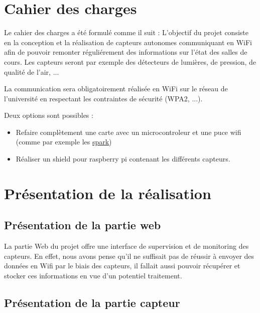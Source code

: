 \section{Cahier des charges}
	\par
	Le cahier des charges a été formulé comme il suit : L'objectif du
	projet consiste en la conception et la réalisation de capteurs autonomes
	communiquant en WiFi afin de pouvoir remonter réguliérement des informations
	sur l'état des salles de cours. Les capteurs seront par exemple des détecteurs de
	lumières, de pression, de qualité de l'air, ...
	\par
	La communication sera obligatoirement réalisée en WiFi sur le réseau
	de l'université en respectant les contraintes de sécurité (WPA2, ...).
	\par
	Deux options sont possibles :
	\begin{itemize}
    \item Refaire complètement une carte avec un microcontroleur et une
    puce wifi (comme par exemple les \href{https://www.spark.io/}{spark})
    \item Réaliser un shield pour raspberry pi contenant les différents capteurs. 
	\end{itemize}
	
\section{Présentation de la réalisation}
	\subsection{Présentation de la partie web}
		\par
		La partie Web du projet offre une interface de supervision et de monitoring des capteurs. En effet, nous avons pense qu'il ne suffisait pas de réussir à envoyer des données en Wifi par le biais des capteurs, il fallait aussi pouvoir récupérer et stocker ces informations en vue d'un potentiel traitement. 

	\subsection{Présentation de la partie capteur}
